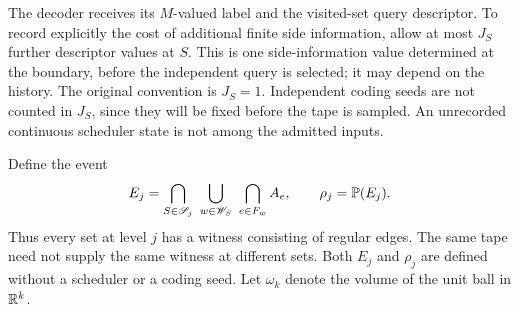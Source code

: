 The decoder receives its $M$-valued label and the visited-set query
descriptor. To record explicitly the cost of additional finite side
information, allow at most $J_S$ further descriptor values at $S$.
This is one side-information value determined at the boundary, before
the independent query is selected; it may depend on the history.
The original convention is
$J_S=1$. Independent coding seeds are not counted in $J_S$, since they
will be fixed before the tape is sampled. An unrecorded continuous
scheduler state is not among the admitted inputs.

Define the event
\begin{equation}\label{eq:v28-robust-event}
 E_j=\bigcap_{S\in\mathscr S_j}
          \ \bigcup_{w\in\mathscr W_S}\ \bigcap_{e\in F_w}A_e,
       \qquad \rho_j=\mathbb P(E_j).
\end{equation}
Thus every set at level $j$ has a witness consisting of regular edges.
The same tape need not supply the same witness at different sets.
Both $E_j$ and $\rho_j$ are defined without a scheduler or a coding
seed. Let $\omega_k$ denote the volume of the unit ball in $\mathbb R^k$.

